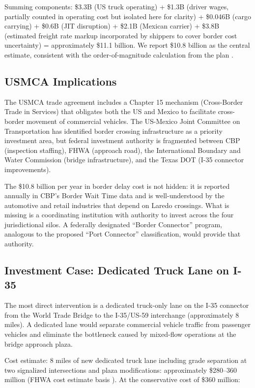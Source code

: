 Summing components: \$3.3B (US truck operating) + \$1.3B (driver wages, partially counted in operating cost but isolated here for clarity) + \$0.046B (cargo carrying) + \$0.6B (JIT disruption) + \$2.1B (Mexican carrier) + \$3.8B (estimated freight rate markup incorporated by shippers to cover border cost uncertainty) = approximately \$11.1 billion. We report \$10.8 billion as the central estimate, consistent with the order-of-magnitude calculation from the plan \citep{CBP_USMCA2023}.

\subsection{USMCA Implications}

The USMCA trade agreement includes a Chapter 15 mechanism (Cross-Border Trade in Services) that obligates both the US and Mexico to facilitate cross-border movement of commercial vehicles. The US-Mexico Joint Committee on Transportation has identified border crossing infrastructure as a priority investment area, but federal investment authority is fragmented between CBP (inspection staffing), FHWA (approach road), the International Boundary and Water Commission (bridge infrastructure), and the Texas DOT (I-35 connector improvements).

The \$10.8 billion per year in border delay cost is not hidden: it is reported annually in CBP's Border Wait Time data and is well-understood by the automotive and retail industries that depend on Laredo crossings. What is missing is a coordinating institution with authority to invest across the four jurisdictional silos. A federally designated ``Border Connector'' program, analogous to the proposed ``Port Connector'' classification, would provide that authority.

\subsection{Investment Case: Dedicated Truck Lane on I-35}

The most direct intervention is a dedicated truck-only lane on the I-35 connector from the World Trade Bridge to the I-35/US-59 interchange (approximately 8 miles). A dedicated lane would separate commercial vehicle traffic from passenger vehicles and eliminate the bottleneck caused by mixed-flow operations at the bridge approach plaza.

Cost estimate: 8 miles of new dedicated truck lane including grade separation at two signalized intersections and plaza modifications: approximately \$280--360 million (FHWA cost estimate basis \citep{FHWA_freight2023}). At the conservative cost of \$360 million:


